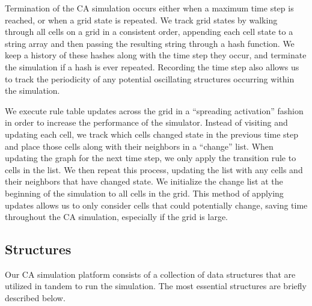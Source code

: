 \documentclass[a4paper,11pt]{report}
\begin{document}
Termination of the CA simulation occurs either when a maximum time step is reached, or when a grid state is repeated. We track grid states by walking through all cells on a grid in a consistent order, appending each cell state to a string array and then passing the resulting string through a hash function. We keep a history of these hashes along with the time step they occur, and terminate the simulation if a hash is ever repeated. Recording the time step also allows us to track the periodicity of any potential oscillating structures occurring within the simulation.

We execute rule table updates across the grid in a ``spreading activation'' fashion in order to increase the performance of the simulator. Instead of visiting and updating each cell, we track which cells changed state in the previous time step and place those cells along with their neighbors in a ``change'' list. When updating the graph for the next time step, we only apply the transition rule to cells in the list. We then repeat this process, updating the list with any cells and their neighbors that have changed state. We initialize the change list at the beginning of the simulation to all cells in the grid. This method of applying updates allows us to only consider cells that could potentially change, saving time throughout the CA simulation, especially if the grid is large. 

\subsection{Structures}
Our CA simulation platform consists of a collection of data structures that are utilized in tandem to run the simulation. The most essential structures are briefly described below.
\end{document}
